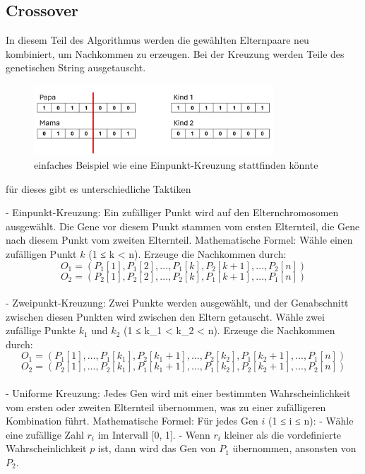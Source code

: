 %
%
%
%
\subsection{Crossover 
\label{genetic_algorithm:crossover}}
In diesem Teil des Algorithmus werden die gewählten Elternpaare 
neu kombiniert, um Nachkommen zu erzeugen. Bei der Kreuzung 
werden Teile des genetischen String ausgetauscht.

\begin{figure} [h]
	\centering
	\includegraphics[width=0.8\textwidth]{
        papers/variationsprinzip_algorithmen/images/teil3/05_genetic_string_cross.png
        }
	\caption{einfaches Beispiel wie eine Einpunkt-Kreuzung stattfinden könnte}
	\label{fig:one_point_crossover}
\end{figure}

für dieses gibt es unterschiedliche Taktiken

- Einpunkt-Kreuzung: Ein zufälliger Punkt wird auf den 
Elternchromosomen ausgewählt. Die Gene vor diesem Punkt 
stammen vom ersten Elternteil, die Gene nach diesem Punkt 
vom zweiten Elternteil. Mathematische Formel:
Wähle einen zufälligen Punkt \( k \) (1 ≤ k < n).
Erzeuge die Nachkommen durch:
\[ O_1 = (P_1[1], P_1[2], \ldots, P_1[k], P_2[k+1], \ldots, P_2[n]) \]
\[ O_2 = (P_2[1], P_2[2], \ldots, P_2[k], P_1[k+1], \ldots, P_1[n]) \]
\\
- Zweipunkt-Kreuzung: Zwei Punkte werden ausgewählt, und 
der Genabschnitt zwischen diesen Punkten wird zwischen 
den Eltern getauscht.
Wähle zwei zufällige Punkte \( k_1 \) und \( k_2 \) (1 ≤ k_1 < k_2 < n).
Erzeuge die Nachkommen durch:
\[ O_1 = (P_1[1], \ldots, P_1[k_1], P_2[k_1+1], \ldots, P_2[k_2], P_1[k_2+1], \ldots, P_1[n]) \]
\[ O_2 = (P_2[1], \ldots, P_2[k_1], P_1[k_1+1], \ldots, P_1[k_2], P_2[k_2+1], \ldots, P_2[n]) \]
\\
- Uniforme Kreuzung: Jedes Gen wird mit einer bestimmten 
Wahrscheinlichkeit vom ersten oder zweiten Elternteil 
übernommen, was zu einer zufälligeren Kombination führt.
Mathematische Formel:
Für jedes Gen \( i \) (1 ≤ i ≤ n):
    - Wähle eine zufällige Zahl \( r_i \) im Intervall [0, 1].
    - Wenn \( r_i \) kleiner als die vordefinierte Wahrscheinlichkeit \( p \) ist, dann wird das Gen von \( P_1 \) übernommen, ansonsten von \( P_2 \).

